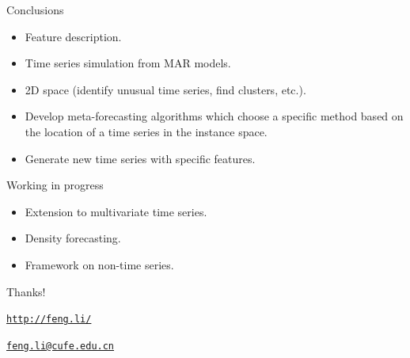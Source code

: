 \documentclass[11pt,ignorenonframetext,compress]{beamer}
\providecommand{\tightlist}{%
  \setlength{\itemsep}{0pt}\setlength{\parskip}{0pt}}
\begin{document}
\begin{frame}{Conclusions}

  \begin{itemize}
    \tightlist
  \item
    Feature description.
  \item
    Time series simulation from MAR models.
  \item
    2D space (identify unusual time series, find clusters, etc.).
  \item
    Develop meta-forecasting algorithms which choose a specific method
    based on the location of a time series in the instance space.
  \item
    Generate new time series with specific features.
  \end{itemize}

\end{frame}

\begin{frame}{Working in progress}

  \begin{itemize}
    \tightlist
  \item Extension to multivariate time series.

  \item Density forecasting.

  \item Framework on non-time series.

  \end{itemize}

\end{frame}


\begin{frame}%
  \tiny
  
  
\end{frame}



\begin{frame}{Thanks!}

  \Large \texttt{\url{http://feng.li/}}

  \Large \texttt{\url{feng.li@cufe.edu.cn}}

\end{frame}
\end{document}

